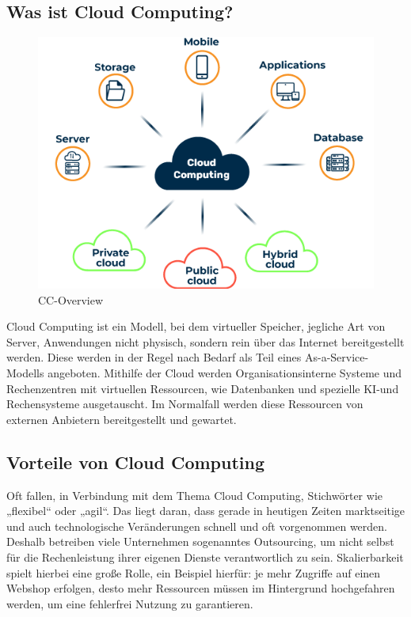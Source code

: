 \subsection{Was ist Cloud Computing?}

\begin{figure}[h]
    \centering
    \includegraphics[scale=0.9]{sections/cloud-computing/images/cc.png}
    \caption{CC-Overview}
\end{figure}

Cloud Computing ist ein Modell, bei dem virtueller Speicher, jegliche Art von Server, Anwendungen nicht physisch, sondern rein über das Internet bereitgestellt werden. Diese werden in der Regel nach Bedarf als Teil eines As-a-Service-Modells angeboten. Mithilfe der Cloud werden Organisationsinterne Systeme und Rechenzentren mit virtuellen Ressourcen, wie Datenbanken und spezielle KI-und Rechensysteme ausgetauscht. Im Normalfall werden diese Ressourcen von externen Anbietern bereitgestellt und gewartet. 
\subsection{Vorteile von Cloud Computing}

Oft fallen, in Verbindung mit dem Thema Cloud Computing, Stichwörter wie „flexibel“ oder „agil“. Das liegt daran, dass gerade in heutigen Zeiten marktseitige und auch technologische Veränderungen schnell und oft vorgenommen werden. Deshalb betreiben viele Unternehmen sogenanntes Outsourcing, um nicht selbst für die Rechenleistung ihrer eigenen Dienste verantwortlich zu sein. Skalierbarkeit spielt hierbei eine große Rolle, ein Beispiel hierfür: je mehr Zugriffe auf einen Webshop erfolgen, desto mehr Ressourcen müssen im Hintergrund hochgefahren werden, um eine fehlerfrei Nutzung zu garantieren.

